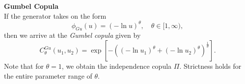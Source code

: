 \textbf{Gumbel Copula}\\
If the generator takes on the form
\begin{equation}
\phi_{G u}(u)=(-\ln u)^{\theta}, \quad \theta \in [1, \infty),
\end{equation}
then we arrive at the \textit{Gumbel copula} given by
\begin{equation}
C_{\theta}^{G u}\left(u_{1}, u_{2}\right)=\exp \left[-\left(\left(-\ln u_{1}\right)^{\theta}+\left(-\ln u_{2}\right)^{\theta}\right)^{\frac{1}{\theta}}\right].
\end{equation}
Note that for $\theta= 1$, we obtain the independence copula $\Pi$.
Strictness holds for the entire parameter range of $\theta$.
\\

